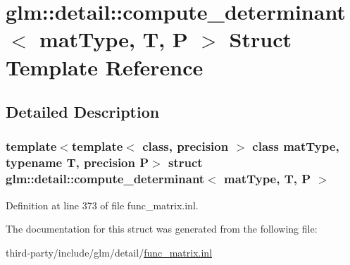 \hypertarget{structglm_1_1detail_1_1compute__determinant}{}\section{glm\+:\+:detail\+:\+:compute\+\_\+determinant$<$ mat\+Type, T, P $>$ Struct Template Reference}
\label{structglm_1_1detail_1_1compute__determinant}


\subsection{Detailed Description}
\subsubsection*{template$<$template$<$ class, precision $>$ class mat\+Type, typename T, precision P$>$\newline
struct glm\+::detail\+::compute\+\_\+determinant$<$ mat\+Type, T, P $>$}



Definition at line 373 of file func\+\_\+matrix.\+inl.



The documentation for this struct was generated from the following file\+:\begin{DoxyCompactItemize}
\item 
third-\/party/include/glm/detail/\hyperlink{func__matrix_8inl}{func\+\_\+matrix.\+inl}\end{DoxyCompactItemize}
